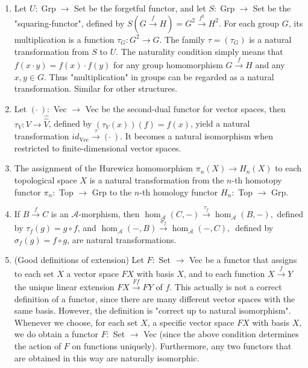\begin{example}
\begin{example}
    \begin{enumerate}
        \item Let $U: \operatorname{Grp} \rightarrow$ Set be the forgetful functor, and let $S: \operatorname{Grp} \rightarrow$ Set be the "squaring-functor", defined by $S(G \xrightarrow{f} H)=G^2 \xrightarrow{f^2} H^2$. For each group $G$, its multiplication is a function $\tau_G: G^2 \rightarrow G$. The family $\tau=\left(\tau_G\right)$ is a natural transformation from $S$ to $U$. The naturality condition simply means that $f(x \cdot y)=f(x) \cdot f(y)$ for any group homomorphism $G \xrightarrow{f} H$ and any $x, y \in G$. Thus "multiplication" in groups can be regarded as a natural transformation. Similar for other structures.
        \item Let $(\,\hat{} \,):$ Vec $\rightarrow$ Vec be the second-dual functor for vector spaces, then $\tau_V: V \rightarrow \hat{\hat{V}}$, defined by $\left(\tau_V(x)\right)(f)=f(x)$, yield a natural transformation $i d{ }_{\mathrm{Vec}} \xrightarrow{\tau}(\,\hat{}\,)$. It becomes a natural isomorphism when restricted to finite-dimensional vector spaces.
        \item The assignment of the Hurewicz homomorphism $\pi_n(X) \rightarrow H_n(X)$ to each topological space $X$ is a natural transformation from the $n$-th homotopy functor $\pi_n:$ Top $\rightarrow$ Grp to the $n$-th homology functor $H_n:$ Top $\rightarrow$ Grp.
        \item If $B \xrightarrow{f} C$ is an $\mathcal{A}$-morphism, then
        $
        \operatorname{hom}_{\mathcal{A}}(C,-) \xrightarrow{\tau_f} \operatorname{hom}_{\mathcal{A}}(B,-),
        $
        defined by $\tau_f(g)=g \circ f$, and
        $
        \operatorname{hom}_{\mathcal{A}}(-, B) \xrightarrow{\sigma_f} \operatorname{hom}_{\mathcal{A}}(-, C) \text {, }
        $
        defined by $\sigma_f(g)=f \circ g$, are natural transformations.
        \item (Good definitions of extension) Let $F:$ Set $\rightarrow$ Vec be a functor that assigns to each set $X$ a vector space $F X$ with basis $X$, and to each function $X \xrightarrow{f} Y$ the unique linear extension $F X \xrightarrow{F f} F Y$ of $f$. This actually is not a correct definition of a functor, since there are many different vector spaces with the same basis. However, the definition is "correct up to natural isomorphism". Whenever we choose, for each set $X$, a specific vector space $F X$ with basis $X$, we do obtain a functor $F:$ Set $\rightarrow$ Vec (since the above condition determines the action of $F$ on functions uniquely). Furthermore, any two functors that are obtained in this way are naturally isomorphic.

\end{enumerate}
\end{example}
\end{example}

